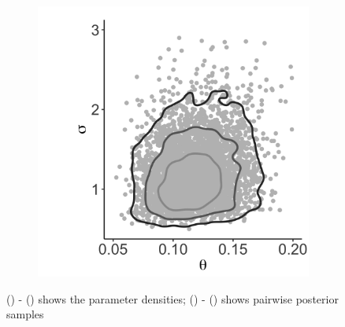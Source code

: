 \documentclass{uwstat572}
\begin{document}
\begin{figure}[H]
\begin{subfigure}[b]{0.3\textwidth}
		\caption{}
		\label{fig:muTheta}
	\end{subfigure}
	\hfill
	\begin{subfigure}[b]{0.3\textwidth}
		\includegraphics[width=\textwidth]{figures/figure_2f.png}
		\caption{}
		\label{fig:sigmaTheta}
	\end{subfigure} 
	\caption{() - () shows the parameter densities;  () - () shows pairwise posterior samples }
	\label{fig:muSigmaThetaDensities}
\end{figure} 
\end{document}
